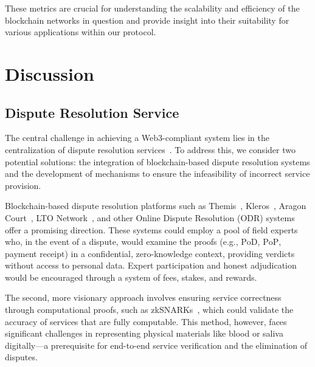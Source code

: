\documentclass[pdftex,twocolumn,epjc3]{svjour3}
\begin{document}


These metrics are crucial for understanding the scalability and efficiency of the blockchain networks in question and provide insight into their suitability for various applications within our protocol.
\section{Discussion}
\label{sec:discussion}

\subsection{Dispute Resolution Service}\label{sec:decentralised-justice}

\begin{sloppypar}
The central challenge in achieving a Web3-compliant system lies in the centralization of dispute resolution services~\cite{ethereumWhatWeb3Why2023}. To address this, we consider two potential solutions: the integration of blockchain-based dispute resolution systems and the development of mechanisms to ensure the infeasibility of incorrect service provision.
\end{sloppypar}

Blockchain-based dispute resolution platforms such as Themis~\cite{mengThemisDecentralizedEscrow2019}, Kleros~\cite{bergollaKlerosSociolegalCase2022, gudkovCrowdArbitrationBlockchain2020}, Aragon Court~\cite{aragonDecentralizedDisputeResolution}, LTO Network~\cite{ltonetworkNextGenBlockchainB2B}, and other Online Dispute Resolution (ODR) systems~\cite{allenGovernanceBlockchainDispute2019} offer a promising direction. These systems could employ a pool of field experts who, in the event of a dispute, would examine the proofs (e.g., $\mathrm{PoD}$, $\mathrm{PoP}$, payment $\mathrm{receipt}$) in a confidential, zero-knowledge context, providing verdicts without access to personal data. Expert participation and honest adjudication would be encouraged through a system of fees, stakes, and rewards.

The second, more visionary approach involves ensuring service correctness through computational proofs, such as zkSNARKs~\cite{ben-sassonSNARKsVerifyingProgram2013}, which could validate the accuracy of services that are fully computable. This method, however, faces significant challenges in representing physical materials like blood or saliva digitally—a prerequisite for end-to-end service verification and the elimination of disputes.
\end{document}
